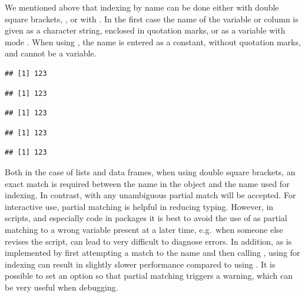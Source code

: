 \documentclass[krantz2]{krantz}\usepackage{knitr}%
\begin{document}
\begin{warningbox}
We mentioned above that indexing by name can be done either with double square brackets, \Roperator{[[]]}, or with \Roperator{\$}. In the first case the name of the variable or column is given as a character string, enclosed in quotation marks, or as a variable with mode . When using \Roperator{\$}, the name is entered as a constant, without quotation marks, and cannot be a variable.

\begin{knitrout}\footnotesize
{}\color{fgcolor}\begin{kframe}
\begin{alltt}
 \hlkwb{<-} \hlstd{(} \hlstd{=} \hlstd{,}  \hlstd{=} \hlstd{)}
\hlstd{x.list[[}\hlstd{]]}
\end{alltt}
\begin{verbatim}
## [1] 123
\end{verbatim}
\begin{alltt}
 \hlkwb{<-} 
\end{alltt}
\begin{verbatim}
## [1] 123
\end{verbatim}
\begin{alltt}
\hlopt{$}
\end{alltt}
\begin{verbatim}
## [1] 123
\end{verbatim}
\begin{alltt}
\hlopt{$}
\end{alltt}
\begin{verbatim}
## [1] 123
\end{verbatim}
\begin{alltt}
\hlopt{$}
\end{alltt}
\begin{verbatim}
## [1] 123
\end{verbatim}
\end{kframe}
\end{knitrout}

Both in the case of lists and data frames, when using double square brackets, an exact match is required between the name in the object and the name used for indexing. In contrast, with \Roperator{\$} any unambiguous partial match will be accepted. For interactive use, partial matching is helpful in reducing typing. However, in scripts, and especially \Rlang code in packages it is best to avoid the use of \Roperator{\$} as partial matching to a wrong variable present at a later time, e.g.\ when someone else revises the script, can lead to very difficult to diagnose errors. In addition, as \Roperator{\$} is implemented by first attempting a match to the name and then calling \Roperator{[[]]}, using \Roperator{\$} for indexing can result in slightly slower performance compared to using \Roperator{[[]]}. It is possible to set an \Rlang option so that partial matching triggers a warning, which can be very useful when debugging.
\end{warningbox}
\end{document}

